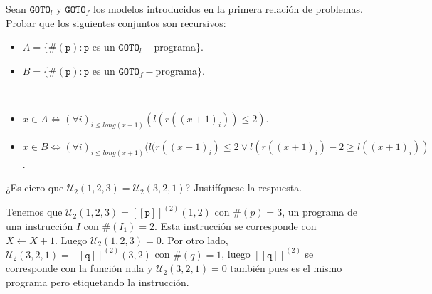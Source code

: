 \documentclass[twoside]{article}
\begin{document}
\begin{ejercicio}{3}
Sean $\texttt{GOTO}_l$ y $\texttt{GOTO}_f$ los modelos introducidos en la primera relación de problemas.
Probar que los siguientes conjuntos son recursivos:
\begin{itemize}
\item $A = \{\#(\texttt{p}) : \texttt{p}$ es un $\texttt{GOTO}_l-$programa$\}$.
\item $B = \{\#(\texttt{p}) : \texttt{p}$ es un $\texttt{GOTO}_f-$programa$\}$.
\end{itemize}
\end{ejercicio}
\begin{solucion}\
\begin{itemize}
\item $x\in A\Leftrightarrow (\forall i)_{i\leq long(x+1)} (l(r((x+1)_i))\leq 2)$.
\item $x\in B\Leftrightarrow (\forall i)_{i\leq long(x+1)} (l(r((x+1)_i)\leq 2\lor l(r((x+1)_i)-2\geq l((x+1)_i))$.
\end{itemize}
\end{solucion}

\newpage

\begin{ejercicio}{4}
¿Es ciero que $\mathcal{U}_2(1,2,3) = \mathcal{U}_2(3,2,1)$? Justifíquese la respuesta.
\end{ejercicio}
\begin{solucion}
Tenemos que $\mathcal{U}_2(1,2,3) = [\![\texttt{p}]\!]^{(2)}(1,2)$ con $\#(p)= 3$,  un programa de una instrucción $I$ con $\#(I_1) = 2$. Esta instrucción se corresponde con $X \leftarrow X+1$. Luego $\mathcal{U}_2(1,2,3) = 0$. Por otro lado, $\mathcal{U}_2(3,2,1) = [\![\texttt{q}]\!]^{(2)}(3,2)$ con $\#(q)= 1$, luego $[\![\texttt{q}]\!]^{(2)}$ se corresponde con la función nula y $\mathcal{U}_2(3,2,1) = 0$ también pues es el mismo programa pero etiquetando la instrucción.
\end{solucion}

\newpage
\end{document}
